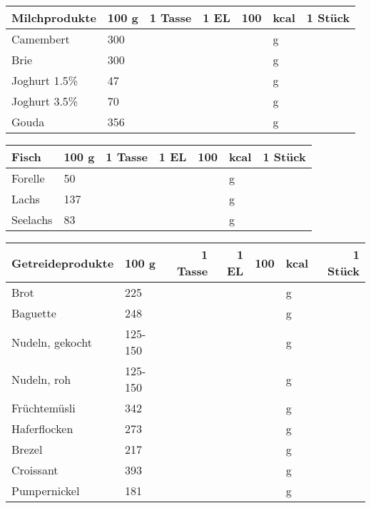 \vfill

\begin{tabularx}{\linewidth}{X|l|r|r|rl|r}
Milchprodukte     &   100 g & 1 Tasse & 1 EL &      100 & kcal    & 1 Stück  \\
\hline
Camembert         &     300 &         &      &          & g       &          \\
Brie              &     300 &         &      &          & g       &          \\
Joghurt 1.5\%     &      47 &         &      &          & g       &          \\
Joghurt 3.5\%     &      70 &         &      &          & g       &          \\
Gouda             &     356 &         &      &          & g       &          \\
\end{tabularx}

\newpage

\begin{tabularx}{\linewidth}{X|l|r|r|rl|r}
Fisch             &   100 g & 1 Tasse & 1 EL &      100 & kcal    & 1 Stück  \\
\hline
Forelle           &      50 &         &      &          & g       &          \\
Lachs             &     137 &         &      &          & g       &          \\
Seelachs          &      83 &         &      &          & g       &          \\
\end{tabularx}

\vfill

\begin{tabularx}{\linewidth}{X|l|r|r|rl|r}
Getreideprodukte  &   100 g & 1 Tasse & 1 EL &      100 & kcal    & 1 Stück  \\
\hline
Brot              &     225 &         &      &          & g       &          \\
Baguette          &     248 &         &      &          & g       &          \\
Nudeln, gekocht   & 125-150 &         &      &          & g       &          \\
Nudeln, roh       & 125-150 &         &      &          & g       &          \\
Früchtemüsli      &     342 &         &      &          & g       &          \\
Haferflocken      &     273 &         &      &          & g       &          \\
Brezel            &     217 &         &      &          & g       &          \\
Croissant         &     393 &         &      &          & g       &          \\
Pumpernickel      &     181 &         &      &          & g       &          \\
\end{tabularx}

